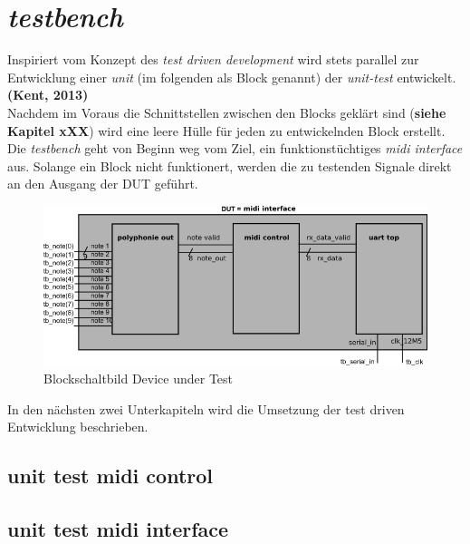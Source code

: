 
\chapter{\textit{testbench}}\label{chap.testbench}
Inspiriert vom Konzept des \textit{test driven development} wird stets parallel zur Entwicklung einer \textit{unit} (im folgenden als Block genannt) der \textit{unit-test} entwickelt.\textbf{(Kent, 2013)} \\

Nachdem im Voraus die Schnittstellen zwischen den Blocks geklärt sind (\textbf{siehe Kapitel xXX}) wird eine leere Hülle für jeden zu entwickelnden Block erstellt. Die \textit{testbench} geht von Beginn weg vom Ziel, ein funktionstüchtiges \textit{midi interface} aus. Solange ein Block nicht funktionert, werden die zu testenden Signale direkt an den Ausgang der DUT geführt.\\

\begin{figure}[H]
	\centering
	\includegraphics[width=1\textwidth]{images/midi_interface/testbench_midiinterface.png}
	\caption{Blockschaltbild Device under Test}
	\label{fig.testbench}
\end{figure}


In den nächsten zwei Unterkapiteln wird die Umsetzung der test driven Entwicklung beschrieben.\\


\section{unit test midi control}\label{chap.testbench}


\section{unit test midi interface}\label{chap.testbench}



